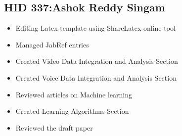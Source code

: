 \documentclass[sigconf]{acmart}
\begin{document}
\subsection{HID 337:Ashok Reddy Singam}
\begin{itemize}
  \item Editing Latex template using ShareLatex online tool
  \item Managed JabRef entries 
  \item Created Video Data Integration and Analysis Section
  \item Created Voice Data Integration and Analysis Section
  \item Reviewed articles on Machine learning 
  \item Created Learning Algorithms Section 
  \item Reviewed the draft paper 
\end{itemize}



\end{document}
